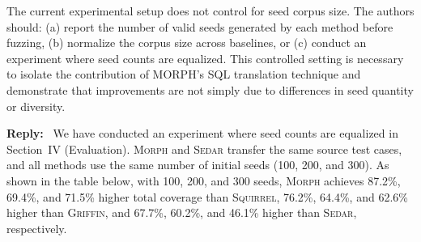 \documentclass[12pt,letterpaper]{article}
\newcommand{\morph}{\textsc{Morph}}
\newcommand{\sedar}{\textsc{Sedar}}
\newcommand{\griffin}{\textsc{Griffin}}
\newcommand{\squirrel}{\textsc{Squirrel}}
\newcommand{\tool}{\morph}
\newcommand{\reply}{\par\nobreak\noindent\textbf{Reply:}\ }
\begin{document}
The current experimental setup does not control for seed corpus size. The authors should: (a) report the number of valid seeds generated by each method before fuzzing, (b) normalize the corpus size across baselines, or (c) conduct an experiment where seed counts are equalized. This controlled setting is necessary to isolate the contribution of MORPH's SQL translation technique and demonstrate that improvements are not simply due to differences in seed quantity or diversity.

\reply
We have conducted an experiment where seed counts are equalized in Section~IV (Evaluation). \tool{} and \sedar{} transfer the same source test cases, and all methods use the same number of initial seeds (100, 200, and 300). As shown in the table below, with 100, 200, and 300 seeds, \tool{} achieves 87.2\%, 69.4\%, and 71.5\% higher total coverage than \squirrel{}, 76.2\%, 64.4\%, and 62.6\% higher than \griffin{}, and 67.7\%, 60.2\%, and 46.1\% higher than \sedar{}, respectively.
\end{document}
